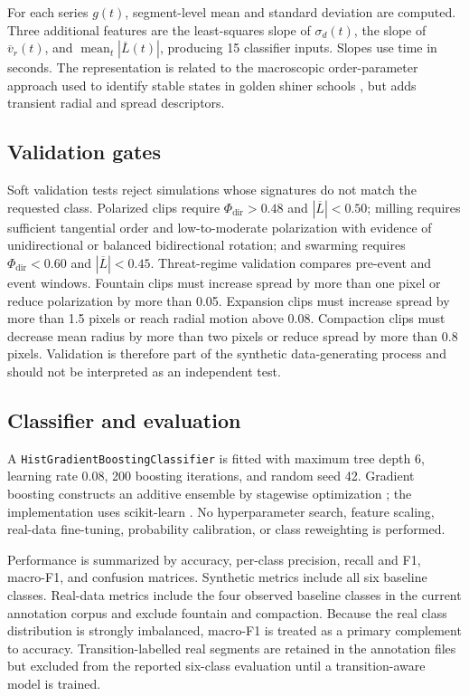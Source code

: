 \documentclass[11pt]{article}
\newcommand{\phidir}{\Phi_{\mathrm{dir}}}
\newcommand{\lbar}{\overline{L}}
\newcommand{\vrbar}{\overline{v}_{r}}
\newcommand{\sigmad}{\sigma_d}
\begin{document}
For each series \(g(t)\), segment-level mean and standard deviation are computed. Three additional
features are the least-squares slope of \(\sigmad(t)\), the slope of \(\vrbar(t)\), and
\(\operatorname{mean}_t|\lbar(t)|\), producing 15 classifier inputs. Slopes use time in seconds.
The representation is related to the macroscopic order-parameter approach used to identify stable
states in golden shiner schools \citep{tunstrom2013}, but adds transient radial and spread descriptors.

\subsection{Validation gates}

Soft validation tests reject simulations whose signatures do not match the requested class. Polarized
clips require \(\phidir>0.48\) and \(|\lbar|<0.50\); milling requires sufficient tangential order and
low-to-moderate polarization with evidence of unidirectional or balanced bidirectional rotation; and
swarming requires \(\phidir<0.60\) and \(|\lbar|<0.45\). Threat-regime validation compares pre-event
and event windows. Fountain clips must increase spread by more than one pixel or reduce polarization by
more than 0.05. Expansion clips must increase spread by more than 1.5 pixels or reach radial motion above
0.08. Compaction clips must decrease mean radius by more than two pixels or reduce spread by more than
0.8 pixels. Validation is therefore part of the synthetic data-generating process and should not be
interpreted as an independent test.

\subsection{Classifier and evaluation}

A \texttt{HistGradientBoostingClassifier} is fitted with maximum tree depth 6, learning rate 0.08,
200 boosting iterations, and random seed 42. Gradient boosting constructs an additive ensemble by
stagewise optimization \citep{friedman2001}; the implementation uses scikit-learn
\citep{pedregosa2011}. No hyperparameter search, feature scaling, real-data fine-tuning, probability
calibration, or class reweighting is performed.

Performance is summarized by accuracy, per-class precision, recall and F1, macro-F1, and confusion
matrices. Synthetic metrics include all six baseline classes. Real-data metrics include the four
observed baseline classes in the current annotation corpus and exclude fountain and compaction. Because
the real class distribution is strongly imbalanced, macro-F1 is treated as a primary complement to
accuracy. Transition-labelled real segments are retained in the annotation files but excluded from the
reported six-class evaluation until a transition-aware model is trained.
\end{document}
